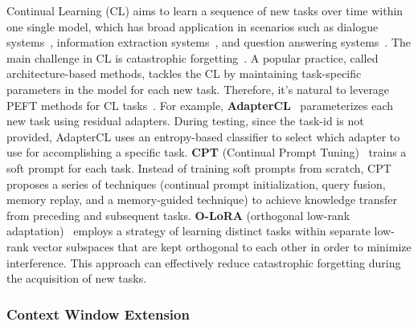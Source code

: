 Continual Learning (CL) aims to learn a sequence of new tasks over time within one single model, which has broad application in scenarios such as dialogue systems~\cite{lee2017toward}, information extraction systems~\cite{chang2006survey}, and question answering systems~\cite{yang2019end}.
The main challenge in CL is catastrophic forgetting~\cite{kirkpatrick2017overcoming}. A popular practice, called architecture-based methods, tackles the CL by maintaining task-specific parameters in the model for each new task. Therefore, it's natural to leverage PEFT methods for CL tasks~\cite{madotto2020continual,zhu2022continual,dai2022lifelong,liang2023prompts}. For example, \textbf{AdapterCL}~\cite{madotto2020continual} parameterizes each new task using residual adapters. During testing, since the task-id is not provided, AdapterCL uses an entropy-based classifier to select which adapter to use for accomplishing a specific task. \textbf{CPT} (Continual Prompt Tuning)~\cite{zhu2022continual} trains a soft prompt for each task. Instead of training soft prompts from scratch, CPT proposes a series of techniques (continual prompt initialization, query fusion, memory replay, and a memory-guided technique) to achieve knowledge transfer from preceding and subsequent tasks.
\textbf{O-LoRA} (orthogonal low-rank adaptation)~\cite{wang2023orthogonal} employs a strategy of learning distinct tasks within separate low-rank vector subspaces that are kept orthogonal to each other in order to minimize interference. This approach can effectively reduce catastrophic forgetting during the acquisition of new tasks.




\subsubsection{Context Window Extension}

